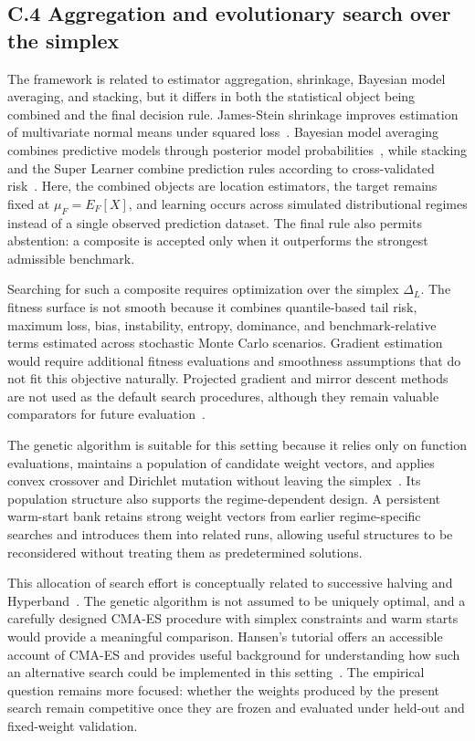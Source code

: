 \subsection*{C.4 Aggregation and evolutionary search over the simplex}

The framework is related to estimator aggregation, shrinkage, Bayesian model averaging, and stacking, but it differs in both the statistical object being combined and the final decision rule. James-Stein shrinkage improves estimation of multivariate normal means under squared loss~\citep{stein1956inadmissibility,james1961estimation}. Bayesian model averaging combines predictive models through posterior model probabilities~\citep{hoeting1999bma}, while stacking and the Super Learner combine prediction rules according to cross-validated risk~\citep{vanderlaan2007super,claeskens2008model,yang2001adaptive}. Here, the combined objects are location estimators, the target remains fixed at \(\mu_F=E_F[X]\), and learning occurs across simulated distributional regimes instead of a single observed prediction dataset. The final rule also permits abstention: a composite is accepted only when it outperforms the strongest admissible benchmark.

Searching for such a composite requires optimization over the simplex $\Delta_L$. The fitness surface is not smooth because it combines quantile-based tail risk, maximum loss, bias, instability, entropy, dominance, and benchmark-relative terms estimated across stochastic Monte Carlo scenarios. Gradient estimation would require additional fitness evaluations and smoothness assumptions that do not fit this objective naturally. Projected gradient and mirror descent methods are not used as the default search procedures, although they remain valuable comparators for future evaluation~\citep{beck2003mirror}.

The genetic algorithm is suitable for this setting because it relies only on function evaluations, maintains a population of candidate weight vectors, and applies convex crossover and Dirichlet mutation without leaving the simplex~\citep{back1996evolutionary,Eiben2015,telikani2021evolutionary,katoch2021review,zhan2022evolutionary,sipper2023meltingpot}. Its population structure also supports the regime-dependent design. A persistent warm-start bank retains strong weight vectors from earlier regime-specific searches and introduces them into related runs, allowing useful structures to be reconsidered without treating them as predetermined solutions.

This allocation of search effort is conceptually related to successive halving and Hyperband~\citep{jamieson2016nonstochastic,li2017hyperband}. The genetic algorithm is not assumed to be uniquely optimal, and a carefully designed CMA-ES procedure with simplex constraints and warm starts would provide a meaningful comparison. Hansen's tutorial offers an accessible account of CMA-ES and provides useful background for understanding how such an alternative search could be implemented in this setting~\citep{hansen2016cma}. The empirical question remains more focused: whether the weights produced by the present search remain competitive once they are frozen and evaluated under held-out and fixed-weight validation.
